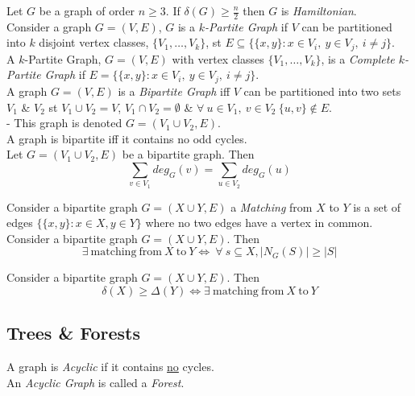 \documentclass[11pt,a4paper]{article}
\begin{document}
Let $G$ be a graph of order $n\geq 3$. If $\delta(G)\geq\frac{n}{2}$ then $G$ is \textit{Hamiltonian}.\\

Consider a graph $G=(V,E)$, $G$ is a \textit{$k$-Partite Graph} if $V$ can be partitioned into $k$ disjoint vertex classes, $\{V_1,\dots,V_k\}$, st $E\subseteq\{\{x,y\}:x\in V_i,\ y\in V_j,\ i\neq j\}$.\\

A $k$-Partite Graph, $G=(V,E)$ with vertex classes $\{V_1,\dots,V_k\}$, is a \textit{Complete $k$-Partite Graph} if $E=\{\{x,y\}:x\in V_i,\ y\in V_j,\ i\neq j\}$.\\

A graph $G=(V,E)$ is a \textit{Bipartite Graph} iff $V$ can be partitioned into two sets $V_1$ \& $V_2$ st $V_1\cup V_2=V$, $V_1\cap V_2=\emptyset$ \& $\forall\ u\in V_1,\ v\in V_2\ \{u,v\}\not\in E$.\\
\NB - This graph is denoted $G=(V_1\cup V_2,E)$.\\

A graph is bipartite iff it contains no odd cycles.\\

Let $G=(V_1\cup V_2,E)$ be a bipartite graph. Then
$$\sum_{v\in V_1}deg_G(v)=\sum_{u\in V_2}deg_G(u)$$

Consider a bipartite graph $G=(X\cup Y,E)$ a \textit{Matching} from $X$ to $Y$ is a set of edges $\{\{x,y\}:x\in X,y\in Y\}$ where no two edges have a vertex in common.\\

Consider a bipartite graph $G=(X\cup Y,E)$. Then
$$\exists\ \mathrm{matching\ from}\ X\ \mathrm{to}\ Y\Leftrightarrow\ \forall\ s\subseteq X,|N_G(S)|\geq|S|$$

Consider a bipartite graph $G=(X\cup Y,E)$. Then
$$\delta(X)\geq\Delta(Y)\Leftrightarrow\exists\ \mathrm{matching\ from}\ X\ \mathrm{to}\ Y$$

\subsection{Trees \& Forests}

A graph is \textit{Acyclic} if it contains \underline{no} cycles.\\
\NB An \textit{Acyclic Graph} is called a \textit{Forest}.\\
\end{document}
